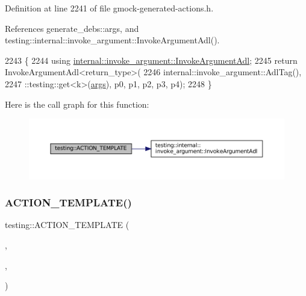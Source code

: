 Definition at line 2241 of file gmock-\/generated-\/actions.\+h.



References generate\+\_\+debs\+::args, and testing\+::internal\+::invoke\+\_\+argument\+::\+Invoke\+Argument\+Adl().


\begin{DoxyCode}
2243                                                         \{
2244   \textcolor{keyword}{using} \hyperlink{namespacetesting_1_1internal_1_1invoke__argument_abd36164191a3e386c50243074854b272}{internal::invoke\_argument::InvokeArgumentAdl};
2245   \textcolor{keywordflow}{return} InvokeArgumentAdl<return\_type>(
2246       internal::invoke\_argument::AdlTag(),
2247       ::testing::get<k>(\hyperlink{namespacegenerate__debs_a75f9143e38df82d83b2e8a6f99cae02c}{args}), p0, p1, p2, p3, p4);
2248 \}
\end{DoxyCode}
Here is the call graph for this function\+:
\nopagebreak
\begin{figure}[H]
\begin{center}
\leavevmode
\includegraphics[width=350pt]{namespacetesting_a505f6d82df233802c5f4235d77dca164_cgraph}
\end{center}
\end{figure}
\mbox{\label{namespacetesting_ab85e5f54a209bf141fc04f8612fbe887}} 
\subsubsection{\texorpdfstring{A\+C\+T\+I\+O\+N\+\_\+\+T\+E\+M\+P\+L\+A\+T\+E()}{ACTION\_TEMPLATE()}\hspace{0.1cm}{\footnotesize\ttfamily [13/28]}}
{\footnotesize\ttfamily testing\+::\+A\+C\+T\+I\+O\+N\+\_\+\+T\+E\+M\+P\+L\+A\+TE (\begin{DoxyParamCaption}\item[{Invoke\+Argument}]{,  }\item[{H\+A\+S\+\_\+1\+\_\+\+T\+E\+M\+P\+L\+A\+T\+E\+\_\+\+P\+A\+R\+A\+MS(int, k)}]{,  }\item[{A\+N\+D\+\_\+6\+\_\+\+V\+A\+L\+U\+E\+\_\+\+P\+A\+R\+A\+MS(p0, p1, p2, p3, p4, p5)}]{ }\end{DoxyParamCaption})}



